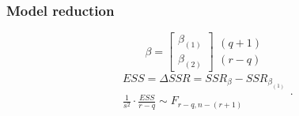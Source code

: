 \documentclass[aspectratio=169,10pt,t]{beamer}
\begin{document}
\begin{frame}[t]
	\frametitle{Model reduction}

	\[
	\beta
	=
	\begin{bmatrix}
		\beta_{ \left( 1 \right) }\\
		\beta_{ \left( 2 \right) }
	\end{bmatrix}
	\begin{matrix}
		\left( q+1 \right) \\
		\left( r-q \right) 
	\end{matrix}
	\] 
	\pause
	\[
		\begin{gathered}
		ESS = \Delta SSR =
		SSR_{\beta} 
		-
		SSR_{\beta_{ \left( 1 \right) }} \\
		\frac{1}{s^{2}} 
		\cdot
		\frac{ESS}{r-q} 
		\sim
		F_{r-q,n- \left( r+1 \right) }
		\end{gathered}
	.\] 

\end{frame}
\end{document}
